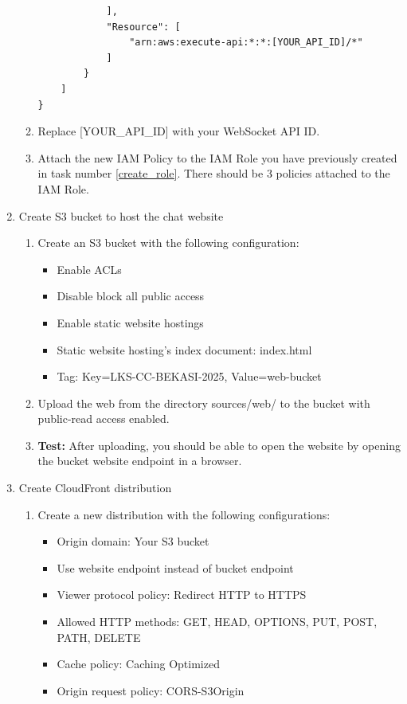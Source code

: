 \documentclass{article}
\begin{document}
\begin{enumerate}
\begin{enumerate}
\begin{verbatim}
            ],
            "Resource": [
                "arn:aws:execute-api:*:*:[YOUR_API_ID]/*"
            ]
        }
    ]
}
    \end{verbatim}
    \item Replace [YOUR\_API\_ID] with your WebSocket API ID.
    \item Attach the new IAM Policy to the IAM Role you have previously created in task number \ref{create_role}. There should be 3 policies attached to the IAM Role.
    \end{enumerate}
  \item Create S3 bucket to host the chat website
    \begin{enumerate}
      \item Create an S3 bucket with the following configuration:
      \begin{itemize}
        \item Enable ACLs
        \item Disable block all public access
        \item Enable static website hostings
        \item Static website hosting's index document: index.html
        \item Tag: Key=LKS-CC-BEKASI-2025, Value=web-bucket
      \end{itemize}
      \item Upload the web from the directory sources/web/ to the bucket with public-read access enabled.
      \item {\color{red}\textbf{Test:}} After uploading, you should be able to open the website by opening the bucket website endpoint in a browser.
    \end{enumerate}
  \item Create CloudFront distribution
    \begin{enumerate}
      \item Create a new distribution with the following configurations:
      \begin{itemize}
        \item Origin domain: Your S3 bucket
        \item Use website endpoint instead of bucket endpoint
        \item Viewer protocol policy: Redirect HTTP to HTTPS
        \item Allowed HTTP methods: GET, HEAD, OPTIONS, PUT, POST, PATH, DELETE
        \item Cache policy: Caching Optimized
        \item Origin request policy: CORS-S3Origin

\end{itemize}
\end{enumerate}
\end{enumerate}
\end{document}
